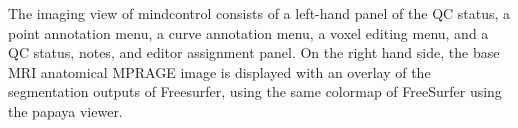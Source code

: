 \label{fig:imagingview}
The imaging view of mindcontrol consists of a left-hand panel of the QC status, a point annotation menu, a curve annotation menu, a voxel editing menu, and a QC status, notes, and editor assignment panel. On the right hand side, the base MRI anatomical MPRAGE image is displayed with an overlay of the segmentation outputs of Freesurfer, using the same colormap of FreeSurfer using the papaya viewer. 